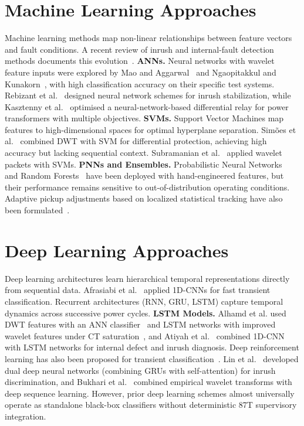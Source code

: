 \documentclass[12pt,a4paper,oneside]{report}
\begin{document}
\section{Machine Learning Approaches}
Machine learning methods map non-linear relationships between feature vectors and fault conditions. A recent review of inrush and internal-fault detection methods documents this evolution~\cite{ref10}.
\textbf{ANNs.} Neural networks with wavelet feature inputs were explored by Mao and Aggarwal~\cite{ref18} and Ngaopitakkul and Kunakorn~\cite{ref19}, with high classification accuracy on their specific test systems. Rebizant et al.~\cite{ref15} designed neural network schemes for inrush stabilization, while Kasztenny et al.~\cite{ref32} optimised a neural-network-based differential relay for power transformers with multiple objectives.
\textbf{SVMs.} Support Vector Machines map features to high-dimensional spaces for optimal hyperplane separation. Sim\~{o}es et al.~\cite{ref13} combined DWT with SVM for differential protection, achieving high accuracy but lacking sequential context. Subramanian et al.~\cite{ref20} applied wavelet packets with SVMs.
\textbf{PNNs and Ensembles.} Probabilistic Neural Networks~\cite{ref9,ref25} and Random Forests~\cite{ref11} have been deployed with hand-engineered features, but their performance remains sensitive to out-of-distribution operating conditions. Adaptive pickup adjustments based on localized statistical tracking have also been formulated~\cite{ref17}.

\section{Deep Learning Approaches}
Deep learning architectures learn hierarchical temporal representations directly from sequential data. Afrasiabi et al.~\cite{ref16} applied 1D-CNNs for fast transient classification. Recurrent architectures (RNN, GRU, LSTM) capture temporal dynamics across successive power cycles.
\textbf{LSTM Models.} Alhamd et al. used DWT features with an ANN classifier~\cite{ref2} and LSTM networks with improved wavelet features under CT saturation~\cite{ref1}, and Atiyah et al.~\cite{ref3} combined 1D-CNN with LSTM networks for internal defect and inrush diagnosis. Deep reinforcement learning has also been proposed for transient classification~\cite{ref12}. Lin et al.~\cite{ref23} developed dual deep neural networks (combining GRUs with self-attention) for inrush discrimination, and Bukhari et al.~\cite{ref29} combined empirical wavelet transforms with deep sequence learning. However, prior deep learning schemes almost universally operate as standalone black-box classifiers without deterministic 87T supervisory integration.
\end{document}
